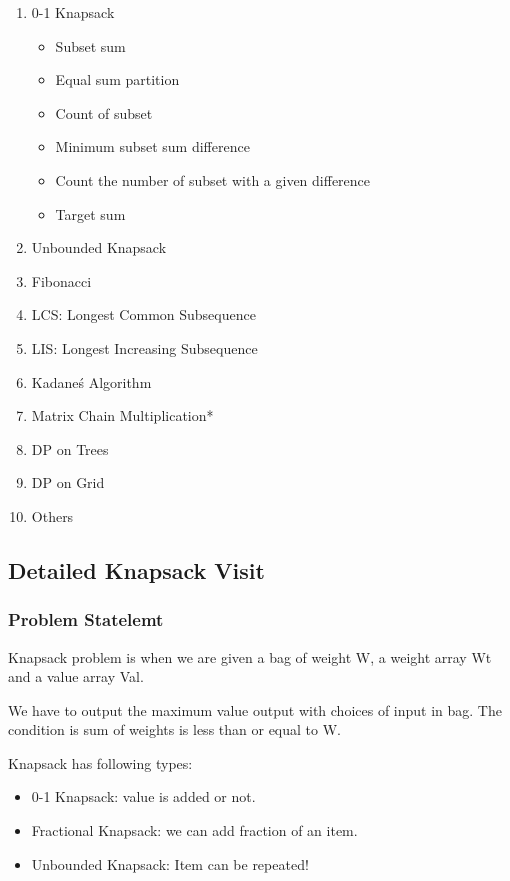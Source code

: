 \documentclass[12pt]{article}
\begin{document}
\begin{enumerate}
\item 0-1 Knapsack
	\begin{itemize}
	\item Subset sum
	\item Equal sum partition
	\item Count of subset 
	\item Minimum subset sum difference
	\item Count the number of subset with a given difference
	\item Target sum
	\end{itemize}
\item Unbounded Knapsack
\item Fibonacci
\item LCS: Longest Common Subsequence
\item LIS: Longest Increasing Subsequence
\item Kadane\'s Algorithm
\item Matrix Chain Multiplication*
\item DP on Trees
\item DP on Grid
\item Others

\end{enumerate}

\subsection{Detailed Knapsack Visit}

\subsubsection*{Problem Statelemt}
Knapsack problem is when we are given a bag of weight W, a weight array Wt and a value array Val.

We have to output the maximum value output with choices of input in bag. The condition is sum of weights is less than or equal to W.

Knapsack has following types:

\begin{itemize}
\item 0-1 Knapsack: value is added or not.
\item Fractional Knapsack: we can add fraction of an item.
\item Unbounded Knapsack: Item can be repeated!
\end{itemize}
\end{document}

